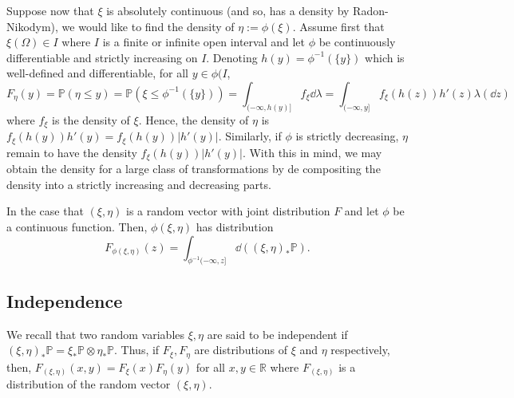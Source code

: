 \documentclass[]{article}
\theoremstyle{definition}
\theoremstyle{definition}
\begin{document}
Suppose now that \(\xi\) is absolutely continuous (and so, has a density by 
Radon-Nikodym), we would like to find the density of \(\eta := \phi(\xi)\).
Assume first that \(\xi(\Omega) \in I\) where \(I\) is a finite or infinite open 
interval and let \(\phi\) be continuously differentiable and strictly increasing 
on \(I\). Denoting \(h(y) = \phi^{-1}(\{y\})\) which is well-defined and differentiable, 
for all \(y \in \phi(I\), 
\[F_\eta(y) = \mathbb{P}(\eta \le y) = \mathbb{P}(\xi \le \phi^{-1}(\{y\})) 
  = \int_{(-\infty, h(y)]} f_\xi \dd \lambda = \int_{(-\infty, y]} f_\xi(h(z)) h'(z) \lambda(\dd z)\]
where \(f_\xi\) is the density of \(\xi\). Hence, the density of \(\eta\) is 
\(f_\xi(h(y)) h'(y) = f_\xi(h(y)) |h'(y)|\). Similarly, if \(\phi\) is strictly 
decreasing, \(\eta\) remain to have the density \(f_\xi(h(y)) |h'(y)|\). 
With this in mind, we may obtain the density for a large class of 
transformations by de compositing the density into a strictly increasing and 
decreasing parts.

In the case that \((\xi, \eta)\) is a random vector with joint distribution 
\(F\) and let \(\phi\) be a continuous function. Then, \(\phi(\xi, \eta)\) 
has distribution
\[F_{\phi(\xi, \eta)}(z) = \int_{\phi^{-1}(-\infty, z]} \dd ((\xi, \eta)_* \mathbb{P}).\]

\subsection{Independence}

We recall that two random variables \(\xi, \eta\) are said to be independent if 
\((\xi, \eta)_* \mathbb{P} = \xi_* \mathbb{P} \otimes \eta_* \mathbb{P}\). 
Thus, if \(F_\xi, F_\eta\) are distributions of \(\xi\) and \(\eta\) respectively, 
then, \(F_{(\xi, \eta)}(x, y) = F_\xi(x) F_\eta(y)\) for all \(x, y \in \mathbb{R}\) 
where \(F_{(\xi, \eta)}\) is a distribution of the random vector \((\xi, \eta)\).
\end{document}
